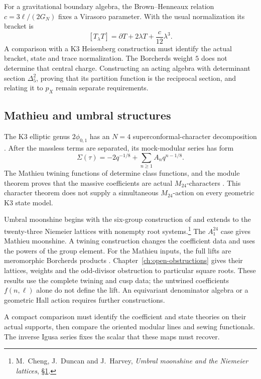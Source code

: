 For a gravitational boundary algebra, the Brown--Henneaux relation
\(c=3\ell/(2G_N)\) fixes a Virasoro parameter.  With the usual
normalization its bracket is
\[
 [T_\lambda T]=\partial T+2\lambda T+\frac c{12}\lambda^3.
\]
A comparison with a K3 Heisenberg construction must identify the
actual bracket, state and trace normalization.  The Borcherds
weight \(5\) does not determine that central charge.  Constructing
an acting algebra with determinant section \(\Delta_5^2\),
proving that its partition function is the reciprocal section,
and relating it to \(p_X\) remain separate requirements.

\subsection{Mathieu and umbral structures}
\label{subsec:zbps-moonshine}

The K3 elliptic genus \(2\phi_{0,1}\) has an \(N=4\)
superconformal-character decomposition \cite{EOT}.  After the
massless terms are separated, its mock-modular series has form
\[
 \Sigma(\tau)=-2q^{-1/8}+\sum_{n\ge1}A_nq^{n-1/8}.
\]
The Mathieu twining functions of \cite{GHV} determine class
functions, and the module theorem proves that the massive
coefficients are actual \(M_{24}\)-characters
\cite{GannonUmbral}.  This character theorem does not supply a
simultaneous \(M_{24}\)-action on every geometric K3 state model.

Umbral moonshine begins with the six-group construction of
\cite{CDH} and extends to the twenty-three Niemeier lattices with
nonempty root systems.\footnote{M.~Cheng, J.~Duncan and J.~Harvey,
\emph{Umbral moonshine and the Niemeier lattices},
\href{https://arxiv.org/abs/1307.5793}{\S1}.}
The \(A_1^{24}\) case gives Mathieu moonshine.
A twining construction changes the coefficient data and uses
the powers of the group element. For the Mathieu inputs, the full
lifts are meromorphic Borcherds products \cite{WangWilliamsMathieu}.
Chapter~\ref{ch:open-obstructions} gives their lattices, weights
and the odd-divisor obstruction to particular square roots.
These results use the complete twining and cusp data; the untwined
coefficients \(f(n,\ell)\) alone do not define the lift.
An equivariant denominator algebra or a geometric Hall action
requires further constructions.

A compact comparison must identify the coefficient and state
theories on their actual supports, then compare the oriented
modular lines and sewing functionals.  The inverse Igusa series
fixes the scalar that these maps must recover.

